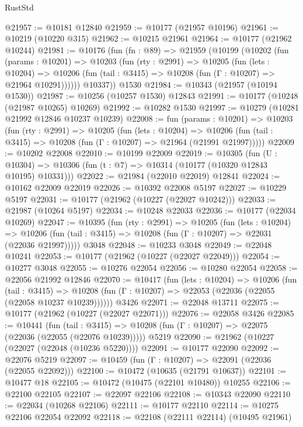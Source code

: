 \begin{lexlean}{RustStd}
\begin{coremodule}
@21957 := @10181 @12840
@21959 := @10177 (@21957 @10196)
@21961 := @10219 (@10220 @315)
@21962 := @10215 @21961
@21964 := @10177 (@21962 @10244)
@21981 := @10176
    (fun (fn : @89) =>
    @21959
      (@10199
        (@10202
          (fun (params : @10201) =>
          @10203
            (fun (rty : @2991) =>
            @10205
              (fun (lets : @10204) =>
              @10206 (fun (tail : @3415) => @10208 (fun (Γ : @10207) => @21964 @10291))))))
        @10337))
    @1530
@21984 := @10343 (@21957 (@10194 @1530))
@21987 := @10256 (@10257 @1530) @12843
@21991 := @10177 (@10248 (@21987 @10265) @10269)
@21992 := @10282 @1530
@21997 := @10279 (@10281 @21992 @12846 @10237 @10239)
@22008 := fun (params : @10201) =>
  @10203
    (fun (rty : @2991) =>
    @10205
      (fun (lets : @10204) =>
      @10206 (fun (tail : @3415) => @10208 (fun (Γ : @10207) => @21964 (@21991 @21997)))))
@22009 := @10202 @22008
@22010 := @10199 @22009
@22019 := @10305
    (fun (U : @10304) => @10306 (fun (t : @7) => @10314 (@10177 (@10320 @12843 @10195) @10331)))
@22022 := @21984 (@22010 @22019) @12841
@22024 := @10162 @22009 @22019
@22026 := @10392 @22008 @5197
@22027 := @10229 @5197
@22031 := @10177 (@21962 (@10227 (@22027 @10242)))
@22033 := @21987 (@10264 @5197)
@22034 := @10248 @22033
@22036 := @10177 (@22034 @10269)
@22047 := @10395
    (fun (rty : @2991) =>
    @10205
      (fun (lets : @10204) =>
      @10206 (fun (tail : @3415) => @10208 (fun (Γ : @10207) => @22031 (@22036 @21997)))))
    @3048
@22048 := @10233 @3048
@22049 := @22048 @10241
@22053 := @10177 (@21962 (@10227 (@22027 @22049)))
@22054 := @10277 @3048
@22055 := @10276 @22054
@22056 := @10280 @22054
@22058 := @22056 @21992 @12846
@22070 := @10417
    (fun (lets : @10204) =>
    @10206
      (fun (tail : @3415) =>
      @10208 (fun (Γ : @10207) => @22053 (@22036 (@22055 (@22058 @10237 @10239))))))
    @3426
@22071 := @22048 @13711
@22075 := @10177 (@21962 (@10227 (@22027 @22071)))
@22076 := @22058 @3426
@22085 := @10441
    (fun (tail : @3415) => @10208 (fun (Γ : @10207) => @22075 (@22036 (@22055 (@22076 @10239)))))
    @5219
@22090 := @21962 (@10227 (@22027 (@22048 (@10236 @5220))))
@22091 := @10177 @22090
@22092 := @22076 @5219
@22097 := @10459 (fun (Γ : @10207) => @22091 (@22036 (@22055 @22092)))
@22100 := @10472 (@10635 (@21791 @10637))
@22101 := @10477 @18
@22105 := @10472 (@10475 (@22101 @10480)) @10255
@22106 := @22100 @22105
@22107 := @22097 @22106
@22108 := @10343 @22090
@22110 := @22034 (@10268 @22106)
@22111 := @10177 @22110
@22114 := @10275 @22106 @22054 @22092
@22118 := @22108 (@22111 @22114) (@10495 @21961)

\end{coremodule}
\end{lexlean}
